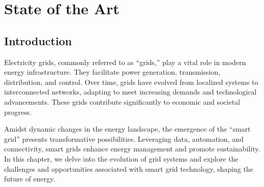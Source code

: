 \chapter{State of the Art} \label{chap:state_of_the_art}


\section*{Introduction}
Electricity grids, commonly referred to as “grids,” play a vital role in modern energy infrastructure. They facilitate power generation, transmission, distribution, and control. Over time, grids have evolved from localized systems to interconnected networks, adapting to meet increasing demands and technological advancements. These grids contribute significantly to economic and societal progress.

Amidst dynamic changes in the energy landscape, the emergence of the “smart grid” presents transformative possibilities. Leveraging data, automation, and connectivity, smart grids enhance energy management and promote sustainability. In this chapter, we delve into the evolution of grid systems and explore the challenges and opportunities associated with smart grid technology, shaping the future of energy.

\newpage

